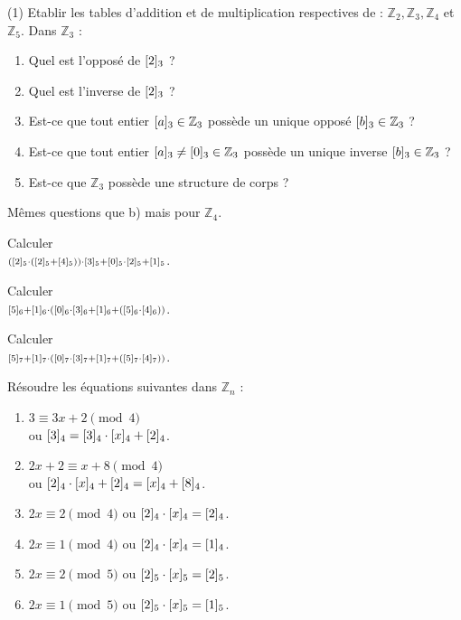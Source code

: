 \begin{exstheorie}
	\vspace*{0.5cm}
	\exo
	\vspace*{-0.5cm}
	\begin{tasks}[label=\alph*),item-indent=6mm,column-sep=0mm ,after-item-skip=1mm,label-offset=2mm,label-align=right](1)
		\task Etablir les tables d'addition et de multiplication respectives de : $\mathbb{Z}_2, \mathbb{Z}_3, \mathbb{Z}_4$ et $\mathbb{Z}_5$.
		\task Dans $\mathbb{Z}_3$ :
		\begin{enumerate}[label=\arabic*)]
			\item Quel est l'opposé de $\cl[3]{2}$ ? 
			\item Quel est l'inverse de $\cl[3]{2}$ ? 
			\item Est-ce que tout entier $\cl[3]{a} \in \mathbb{Z}_3$ possède un unique opposé $\cl[3]{b} \in \mathbb{Z}_3$ ? 
			\item Est-ce que tout entier $\cl[3]{a} \neq \cl[3]{0} \in \mathbb{Z}_3$ possède un unique inverse $\cl[3]{b} \in \mathbb{Z}_3$ ? 
			\item Est-ce que $\mathbb{Z}_3$ possède une structure de corps ? 
		\end{enumerate}
		\task Mêmes questions que b) mais pour $\mathbb{Z}_4$.
		
		\task Calculer \\ $\scriptstyle \left(\cl[5]{2} \cdot (\cl[5]{2} + \cl[5]{4})\right) \cdot \cl[5]{3} + \cl[5]{0} \cdot \cl[5]{2} + \cl[5]{1}$.
		
		\task Calculer \\ $\scriptstyle \cl[6]{5} + \cl[6]{1} \cdot \left(\cl[6]{0} \cdot \cl[6]{3} + \cl[6]{1} + (\cl[6]{5} \cdot \cl[6]{4})\right)$.

\columnbreak
		
		\task Calculer \\ $ \scriptstyle \cl[7]{5} + \cl[7]{1} \cdot \left(\cl[7]{0} \cdot \cl[7]{3} + \cl[7]{1} + (\cl[7]{5} \cdot \cl[7]{4})\right)$.
		
		\task Résoudre les équations suivantes dans $\mathbb{Z}_n$ :
		\begin{enumerate}[label=\arabic*)]
			\item $3 \equiv 3x + 2 \pmod 4$ \\ ou $\cl[4]{3} = \cl[4]{3} \cdot \cl[4]{x} + \cl[4]{2}$.
			\item $2x + 2 \equiv x + 8 \pmod 4$ \\ ou $\cl[4]{2} \cdot \cl[4]{x} + \cl[4]{2} = \cl[4]{x} + \cl[4]{8}$.
			\item $2x \equiv 2 \pmod 4$ ou $\cl[4]{2} \cdot \cl[4]{x} = \cl[4]{2}$.
			\item $2x \equiv 1 \pmod 4$ ou $\cl[4]{2} \cdot \cl[4]{x} = \cl[4]{1}$.
			\item $2x \equiv 2 \pmod 5$ ou $\cl[5]{2} \cdot \cl[5]{x} = \cl[5]{2}$.
			\item $2x \equiv 1 \pmod 5$ ou  $\cl[5]{2} \cdot \cl[5]{x} = \cl[5]{1}$.
		\end{enumerate}
		

\end{tasks}
\end{exstheorie}
